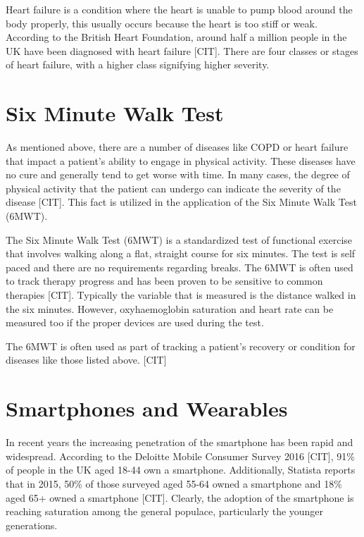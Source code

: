             Heart failure is a condition where the heart is unable to pump blood around the body properly, this usually occurs because the heart is too stiff or weak. According to the British Heart Foundation, around half a million people in the UK have been diagnosed with heart failure [CIT]. There are four classes or stages of heart failure, with a higher class signifying higher severity. 

        \section{Six Minute Walk Test}

            As mentioned above, there are a number of diseases like COPD or heart failure that impact a patient's ability to engage in physical activity. These diseases have no cure and generally tend to get worse with time. In many cases, the degree of physical activity that the patient can undergo can indicate the severity of the disease [CIT]. This fact is utilized in the application of the Six Minute Walk Test (6MWT).

            The Six Minute Walk Test (6MWT) is a standardized test of functional exercise that involves walking along a flat, straight course for six minutes. The test is self paced and there are no requirements regarding breaks. The 6MWT is often used to track therapy progress and has been proven to be sensitive to common therapies [CIT]. Typically the variable that is measured is the distance walked in the six minutes. However, oxyhaemoglobin saturation and heart rate can be measured too if the proper devices are used during the test.

            The 6MWT is often used as part of tracking a patient's recovery or condition for diseases like those listed above. [CIT]

        \section{Smartphones and Wearables}

            In recent years the increasing penetration of the smartphone has been rapid and widespread. According to the Deloitte Mobile Consumer Survey 2016 [CIT], 91\% of people in the UK aged 18-44 own a smartphone. Additionally, Statista reports that in 2015, 50\% of those surveyed aged 55-64 owned a smartphone and 18\% aged 65+ owned a smartphone [CIT]. Clearly, the adoption of the smartphone is reaching saturation among the general populace, particularly the younger generations.

